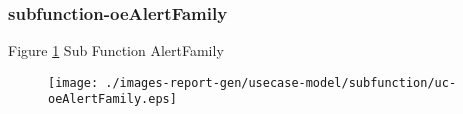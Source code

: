 \subsubsection{subfunction-oeAlertFamily}

\label{RE-use-case-oeAlertFamily}


Figure \ref{fig:lu.uni.lassy.excalibur.g01.specification-RE-UCD-uc-oeAlertFamily}
Sub Function AlertFamily

\begin{figure}[htbp]
\begin{center}

\texttt{[image: ./images-report-gen/usecase-model/subfunction/uc-oeAlertFamily.eps]}
\end{center}
\caption[lu.uni.lassy.excalibur.g01.specification Use Case Diagram: uc-oeAlertFamily]{}
\label{fig:lu.uni.lassy.excalibur.g01.specification-RE-UCD-uc-oeAlertFamily}
\end{figure}
\vspace{0.5cm}
